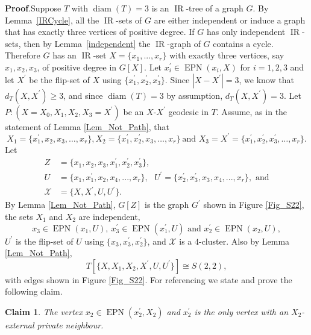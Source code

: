 \documentclass[12pt]{article}%
\newtheorem{claim}{Claim}
\begin{document}
\noindent\textbf{Proof}.\hspace{0.1in}Suppose $T$ with $\operatorname{diam}%
(T)=3$ is an $\operatorname{IR}$-tree of a graph $G$. By Lemma~\ref{IRCycle},
all the $\operatorname{IR}$-sets of $G$ are either independent or induce a
graph that has exactly three vertices of positive degree. If $G$ has only
independent $\operatorname{IR}$-sets, then by Lemma~\ref{independent} the
$\operatorname{IR}$-graph of $G$ contains a cycle. Therefore $G$ has an
$\operatorname{IR}$-set $X=\{x_{1},...,x_{r}\}$ with exactly three vertices,
say $x_{1},x_{2},x_{3}$, of positive degree in $G[X]$. Let $x_{i}^{\prime}%
\in\operatorname{EPN}(x_{i},X)$ for $i=1,2,3$ and let $X^{\prime}$ be the
flip-set of $X$ using $\{x_{1}^{\prime},x_{2}^{\prime},x_{3}^{\prime}\}$.
Since $|X-X^{\prime}|=3$, we know that $d_{T}(X,X^{\prime})\geq3$, and since
$\operatorname{diam}(T)=3$ by assumption, $d_{T}(X,X^{\prime})=3$. Let
$P:(X=X_{0},X_{1},X_{2},X_{3}=X^{\prime})$ be an $X$-$X^{\prime}$ geodesic in
$T$. Assume, as in the statement of Lemma \ref{Lem_Not_Path}, that
\[
X_{1}=\{x_{1}^{\prime},x_{2},x_{3},\dots,x_{r}\},X_{2}=\{x_{1}^{\prime}%
,x_{2}^{\prime},x_{3},\dots,x_{r}\}\ \text{and\ }X_{3}=X^{\prime}%
=\{x_{1}^{\prime},x_{2}^{\prime},x_{3}^{\prime},\dots,x_{r}\}.
\]
Let
\begin{align*}
Z  &  =\{x_{1},x_{2},x_{3},x_{1}^{\prime},x_{2}^{\prime},x_{3}^{\prime}\},\\
U  &  =\{x_{1},x_{1}^{\prime},x_{2},x_{4},...,x_{r}\},\text{\ }U^{\prime
}=\{x_{2}^{\prime},x_{3}^{\prime},x_{3},x_{4},...,x_{r}\},\text{\ and}\\
\mathcal{X}  &  =\{X,X^{\prime},U,U^{\prime}\}.
\end{align*}
By Lemma \ref{Lem_Not_Path}, $G[Z]$ is the graph $G^{\prime}$ shown in Figure
\ref{Fig_S22}, the sets $X_{1}$ and $X_{2}$ are independent,
\begin{equation}
x_{3}\in\operatorname{EPN}(x_{1},U),\ x_{3}^{\prime}\in\operatorname{EPN}%
(x_{1}^{\prime},U)\text{\ and\ }x_{2}^{\prime}\in\operatorname{EPN}(x_{2},U),
\label{eq_epns}%
\end{equation}
$U^{\prime}$ is the flip-set of $U$ using $\{x_{3},x_{3}^{\prime}%
,x_{2}^{\prime}\}$, and $\mathcal{X}$ is a $4$-cluster. Also by Lemma
\ref{Lem_Not_Path},%
\[
T[\{X,X_{1},X_{2},X^{\prime},U,U^{\prime}\}]\cong S(2,2),
\]
with edges shown in Figure \ref{Fig_S22}. For referencing we state and prove
the following claim.

\begin{claim}
\label{Cl1}The vertex $x_{2}\in\operatorname{EPN}(x_{2}^{\prime},X_{2})$ and
$x_{2}^{\prime}$ is the only vertex with an $X_{2}$-external private neighbour.
\end{claim}
\end{document}
